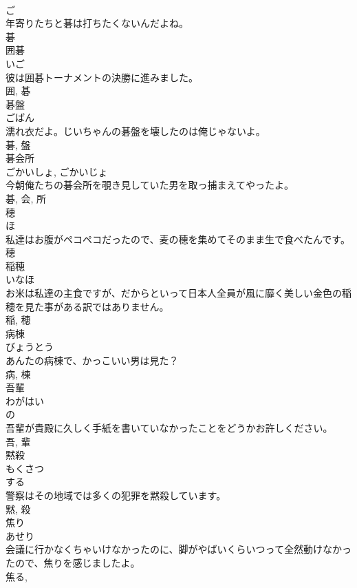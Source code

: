 \documentclass[8pt]{extreport}
\begin{document}
\begin{CJK}{UTF8}{min}
\\	ご	
\\	年寄りたちと碁は打ちたくないんだよね。	
\\	碁	
\\	囲碁	
\\	いご	
\\	彼は囲碁トーナメントの決勝に進みました。	
\\	囲, 碁	
\\	碁盤	
\\	ごばん	
\\	濡れ衣だよ。じいちゃんの碁盤を壊したのは俺じゃないよ。	
\\	碁, 盤	
\\	碁会所	
\\	ごかいしょ, ごかいじょ	
\\	今朝俺たちの碁会所を覗き見していた男を取っ捕まえてやったよ。	
\\	碁, 会, 所	
\\	穂	
\\	ほ	
\\	私達はお腹がペコペコだったので、麦の穂を集めてそのまま生で食べたんです。	
\\	穂	
\\	稲穂	
\\	いなほ	
\\	お米は私達の主食ですが、だからといって日本人全員が風に靡く美しい金色の稲穂を見た事がある訳ではありません。	
\\	稲, 穂	
\\	病棟	
\\	びょうとう	
\\	あんたの病棟で、かっこいい男は見た？	
\\	病, 棟	
\\	吾輩	
\\	わがはい	
\\	の 
\\	吾輩が貴殿に久しく手紙を書いていなかったことをどうかお許しください。	
\\	吾, 輩	
\\	黙殺	
\\	もくさつ	
\\	する 
\\	警察はその地域では多くの犯罪を黙殺しています。	
\\	黙, 殺	
\\	焦り	
\\	あせり	
\\	会議に行かなくちゃいけなかったのに、脚がやばいくらいつって全然動けなかったので、焦りを感じましたよ。	
\\	焦る, 

\end{CJK}
\end{document}
